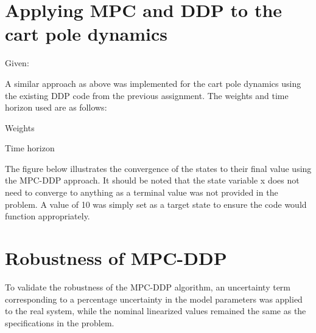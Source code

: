 \documentclass{article}
\begin{document}
\section {Applying MPC and DDP to the cart pole dynamics}

Given:


A similar approach as above was implemented for the cart pole dynamics using the existing DDP code from the previous assignment. The weights and time horizon used are as follows:


Weights

Time horizon


The figure below illustrates the convergence of the states to their final value using the MPC-DDP approach. It should be noted that the state variable x does not need to converge to anything as a terminal value was not provided in the problem. A value of 10 was simply set as a target state to ensure the code would function appropriately.


\section {Robustness of MPC-DDP}

To validate the robustness of the MPC-DDP algorithm, an uncertainty term corresponding to a percentage uncertainty in the model parameters was applied to the real system, while the nominal linearized values remained the same as the specifications in the problem. 
\end{document}
